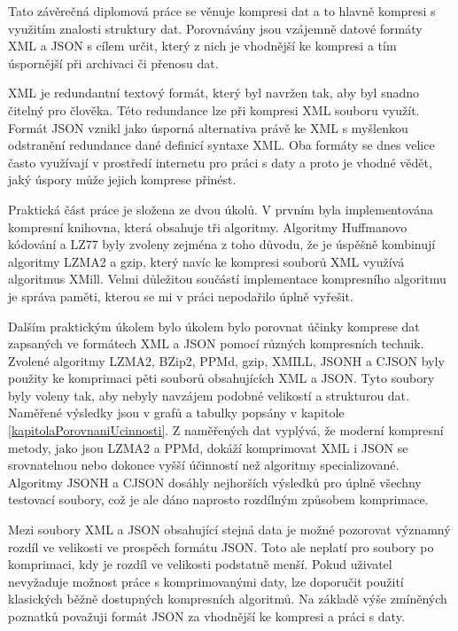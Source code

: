 

Tato závěrečná diplomová práce se věnuje kompresi dat a to hlavně kompresi s využitím znalosti struktury dat. Porovnávány jsou vzájemně datové formáty XML a JSON s cílem určit, který z nich je vhodnější ke kompresi a tím úspornější při archivaci či přenosu dat.

XML je redundantní textový formát, který byl navržen tak, aby byl snadno čitelný pro člověka. Této redundance lze při kompresi XML souboru využít. Formát JSON vznikl jako úsporná alternativa právě ke XML s myšlenkou odstranění redundance dané definicí syntaxe XML. Oba formáty se dnes velice často využívají v prostředí internetu pro práci s daty a proto je vhodné vědět, jaký úspory může jejich komprese přinést.

Praktická část práce je složena ze dvou úkolů. V prvním byla implementována kompresní knihovna, která obsahuje tři algoritmy. Algoritmy Huffmanovo kódování a LZ77 byly zvoleny zejména z toho důvodu, že je úspěšně kombinují algoritmy LZMA2 a gzip, který navíc ke kompresi souborů XML využívá algoritmus XMill. Velmi důležitou součástí implementace kompresního algoritmu je správa paměti, kterou se mi v práci nepodařilo úplně vyřešit.

Dalším praktickým úkolem bylo úkolem bylo porovnat účinky komprese dat zapsaných ve formátech XML a  JSON pomocí různých kompresních technik. Zvolené algoritmy LZMA2, BZip2, PPMd, gzip, XMILL, JSONH a CJSON byly použity ke komprimaci pěti souborů obsahujících XML a JSON. Tyto soubory byly voleny tak, aby nebyly navzájem podobné velikostí a strukturou dat. Naměřené výsledky jsou v grafů a tabulky popsány v kapitole \ref{kapitolaPorovnaniUcinnosti}. Z naměřených dat vyplývá, že moderní kompresní metody, jako jsou LZMA2 a PPMd, dokáží komprimovat XML i JSON se srovnatelnou nebo dokonce vyšší účinností než algoritmy specializované. Algoritmy JSONH a CJSON dosáhly nejhorších výsledků pro úplně všechny testovací soubory, což je ale dáno naprosto rozdílným způsobem komprimace.

Mezi soubory XML a JSON obsahující stejná data je možné pozorovat významný rozdíl ve velikosti ve prospěch formátu JSON. Toto ale neplatí pro soubory po komprimaci, kdy je rozdíl ve velikosti podstatně menší. Pokud uživatel nevyžaduje možnost práce s komprimovanými daty, lze doporučit použití klasických běžně dostupných kompresních algoritmů. Na základě výše zmíněných poznatků považuji formát JSON za vhodnější ke kompresi a práci s daty.
